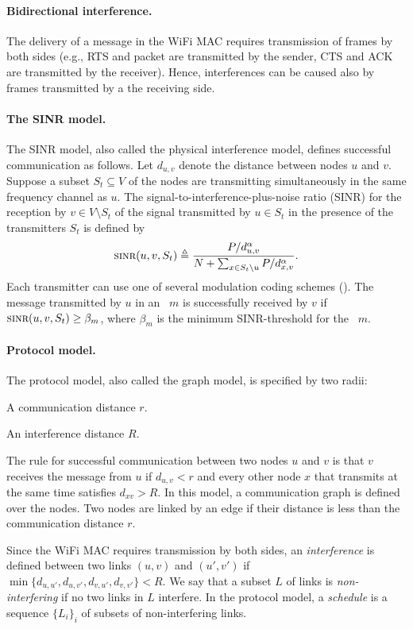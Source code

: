 \documentclass[12pt]{article}
\newenvironment{proof sketch}[1]{\noindent {\emph{Proof sketch of #1:}}}{\hfill \qed}
\newcommand{\eqdf}{\triangleq}
\newcommand{\SINR}{\text{\sc{sinr}}}
\newcommand{\MCS}{\text{\sc{mcs}}}
\begin{document}
\paragraph{Bidirectional interference.}
The delivery of a message in the WiFi MAC requires transmission of
frames by both sides (e.g., RTS and packet are transmitted by the
sender, CTS and ACK are transmitted by the receiver). Hence,
interferences can be caused also by frames transmitted by a the
receiving side.

\paragraph{The SINR model.}
The SINR model, also called the physical
interference model, defines successful communication as follows.  Let
$d_{u,v}$ denote the distance between nodes $u$ and $v$.  Suppose a subset
$S_t\subseteq V$ of the nodes are transmitting simultaneously in the
same frequency channel as $u$.  The signal-to-interference-plus-noise
ratio (SINR) for the reception by $v\in V\setminus S_t$ of the signal
transmitted by $u\in S_t$ in the presence of the transmitters $S_t$ is
defined by
\[
\SINR(u,v,S_t) \eqdf \frac{P/d_{u,v}^{\alpha}}{N+\sum_{x\in
    S_t\setminus{u}} P/d_{x,v}^{\alpha}}.
\]
Each transmitter can use one of several modulation coding schemes (\MCS).
The message transmitted by $u$ in an \MCS\ $m$ is successfully received by
$v$ if $\SINR(u,v,S_t)\geq \beta_m$, where $\beta_m$ is the minimum
SINR-threshold for the \MCS\ $m$.

\paragraph{Protocol model.}
The protocol model, also called the graph model, is specified by two
radii:
\begin{inparaenum}[(i)]
\item A communication distance $r$.
\item An interference distance $R$.
\end{inparaenum}
The rule for successful communication between two nodes $u$ and $v$ is
that $v$ receives the message from $u$ if $d_{u,v}<r$ and every other node
$x$ that transmits at the same time satisfies $d_{xv}> R$.  In this
model, a communication graph is defined over the nodes.  Two nodes are
linked by an edge if their distance is less than the communication
distance $r$.

Since the WiFi MAC requires transmission by both sides, an
\emph{interference} is defined between two links $(u,v)$ and $(u',v')$
if $\min\{d_{u,u'},d_{u,v'}, d_{v,u'}, d_{v,v'}\} < R$.  We say that a
subset $L$ of links is \emph{non-interfering} if no two links in $L$
interfere.  In the protocol model, a \emph{schedule} is a sequence
$\{L_i\}_i$ of subsets of non-interfering links.
\end{document}
